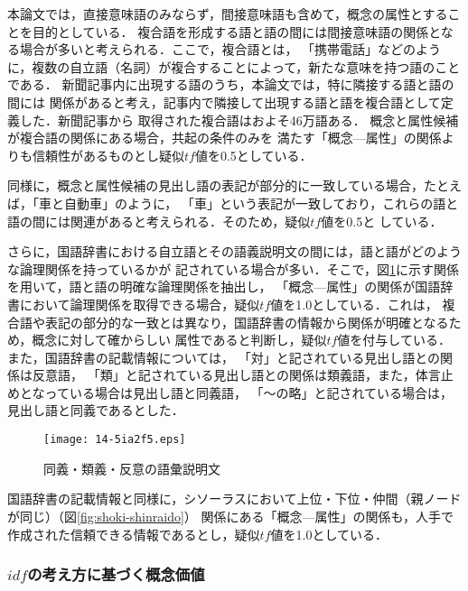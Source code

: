 \documentclass[japanese]{jnlp_1.3e}
\begin{document}
本論文では，直接意味語のみならず，間接意味語も含めて，概念の属性とすることを目的としている．
複合語を形成する語と語の間には間接意味語の関係となる場合が多いと考えられる．ここで，複合語とは，
「携帯電話」などのように，複数の自立語（名詞）が複合することによって，新たな意味を持つ語のことである．
新聞記事内に出現する語のうち，本論文では，特に隣接する語と語の間には
関係があると考え，記事内で隣接して出現する語と語を複合語として定義した．新聞記事から
取得された複合語はおよそ46万語ある． 概念と属性候補が複合語の関係にある場合，共起の条件のみを
満たす「概念—属性」の関係よりも信頼性があるものとし疑似$\mathit{tf}$値を0.5としている．

同様に，概念と属性候補の見出し語の表記が部分的に一致している場合，たとえば，「車と自動車」のように，
「車」という表記が一致しており，これらの語と語の間には関連があると考えられる．そのため，疑似$\mathit{tf}$値を0.5と
している．

さらに，国語辞書における自立語とその語義説明文の間には，語と語がどのような論理関係を持っているかが
記されている場合が多い．そこで，図\ref{fig:kankei}に示す関係を用いて，語と語の明確な論理関係を抽出し，
「概念—属性」の関係が国語辞書において論理関係を取得できる場合，疑似$\mathit{tf}$値を1.0としている．これは，
複合語や表記の部分的な一致とは異なり，国語辞書の情報から関係が明確となるため，概念に対して確からしい
属性であると判断し，疑似$\mathit{tf}$値を付与している．また，国語辞書の記載情報については，
「対」と記されている見出し語との関係は反意語，
「類」と記されている見出し語との関係は類義語，また，体言止めとなっている場合は見出し語と同義語，
「〜の略」と記されている場合は，見出し語と同義であるとした．

\begin{figure}[t]
	\begin{center}
	\texttt{[image: 14-5ia2f5.eps]}
		\caption{同義・類義・反意の語彙説明文}
		\label{fig:kankei}
	\end{center}
\end{figure}

国語辞書の記載情報と同様に，シソーラスにおいて上位・下位・仲間（親ノードが同じ）（図\ref{fig:shoki-shinraido}）
関係にある「概念—属性」の関係も，人手で作成された信頼できる情報であるとし，疑似$\mathit{tf}$値を1.0としている．



\subsubsection{$\mathit{idf}$の考え方に基づく概念価値}
\end{document}

